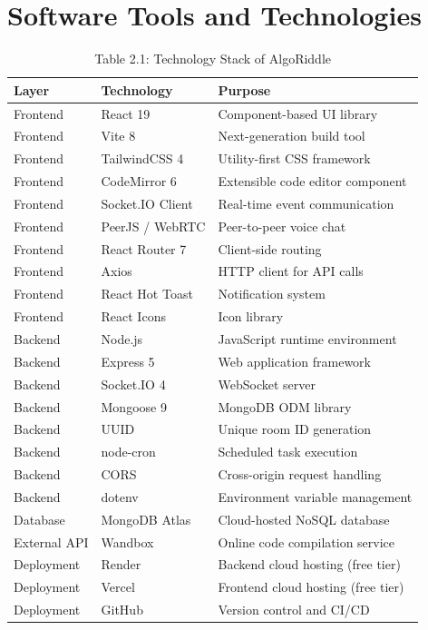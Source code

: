 \documentclass[12pt,a4paper,oneside]{report}
\newenvironment{reporttable}{%
  \small\singlespacing
}{%
  \doublespacing
}
\begin{document}
\section{Software Tools and Technologies}

\begin{table}[H]
\centering
\caption{Table 2.1: Technology Stack of AlgoRiddle}
\label{tab:techstack}
\begin{reporttable}
\begin{tabular}{@{} l l p{6.5cm} @{}}
\toprule
\textbf{Layer} & \textbf{Technology} & \textbf{Purpose} \\
\midrule
Frontend & React 19 & Component-based UI library \\
Frontend & Vite 8 & Next-generation build tool \\
Frontend & TailwindCSS 4 & Utility-first CSS framework \\
Frontend & CodeMirror 6 & Extensible code editor component \\
Frontend & Socket.IO Client & Real-time event communication \\
Frontend & PeerJS / WebRTC & Peer-to-peer voice chat \\
Frontend & React Router 7 & Client-side routing \\
Frontend & Axios & HTTP client for API calls \\
Frontend & React Hot Toast & Notification system \\
Frontend & React Icons & Icon library \\
\midrule
Backend & Node.js & JavaScript runtime environment \\
Backend & Express 5 & Web application framework \\
Backend & Socket.IO 4 & WebSocket server \\
Backend & Mongoose 9 & MongoDB ODM library \\
Backend & UUID & Unique room ID generation \\
Backend & node-cron & Scheduled task execution \\
Backend & CORS & Cross-origin request handling \\
Backend & dotenv & Environment variable management \\
\midrule
Database & MongoDB Atlas & Cloud-hosted NoSQL database \\
\midrule
External API & Wandbox & Online code compilation service \\
\midrule
Deployment & Render & Backend cloud hosting (free tier) \\
Deployment & Vercel & Frontend cloud hosting (free tier) \\
Deployment & GitHub & Version control and CI/CD \\
\bottomrule
\end{tabular}
\end{reporttable}
\end{table}
\end{document}

